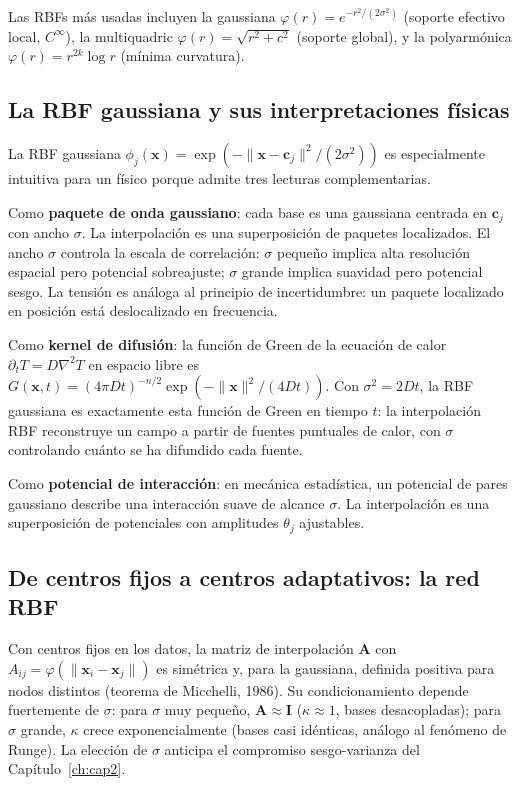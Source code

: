Las RBFs más usadas incluyen la gaussiana
$\varphi(r) = e^{-r^2/(2\sigma^2)}$ (soporte efectivo local, $C^\infty$),
la multiquadric $\varphi(r) = \sqrt{r^2+c^2}$ (soporte global), y la
polyarmónica $\varphi(r) = r^{2k}\log r$ (mínima curvatura).

\subsection{La RBF gaussiana y sus interpretaciones físicas}
\label{subsec:rbf_gaussiana}

La RBF gaussiana $\phi_j(\bm{x}) = \exp(-\|\bm{x}-\bm{c}_j\|^2
/(2\sigma^2))$ es especialmente intuitiva para un físico porque admite
tres lecturas complementarias.

Como \textbf{paquete de onda gaussiano}: cada base es una gaussiana
centrada en $\bm{c}_j$ con ancho $\sigma$. La interpolación es una
superposición de paquetes localizados. El ancho $\sigma$ controla la
escala de correlación: $\sigma$ pequeño implica alta resolución espacial
pero potencial sobreajuste; $\sigma$ grande implica suavidad pero
potencial sesgo. La tensión es análoga al principio de incertidumbre: un
paquete localizado en posición está deslocalizado en frecuencia.

Como \textbf{kernel de difusión}: la función de Green de la ecuación de
calor $\partial_t T = D\nabla^2 T$ en espacio libre es
$G(\bm{x},t) = (4\pi Dt)^{-n/2}\exp(-\|\bm{x}\|^2/(4Dt))$.
Con $\sigma^2 = 2Dt$, la RBF gaussiana es exactamente esta función de
Green en tiempo $t$: la interpolación RBF reconstruye un campo a partir
de fuentes puntuales de calor, con $\sigma$ controlando cuánto se ha
difundido cada fuente.

Como \textbf{potencial de interacción}: en mecánica estadística, un
potencial de pares gaussiano describe una interacción suave de alcance
$\sigma$. La interpolación es una superposición de potenciales con
amplitudes $\theta_j$ ajustables.

\subsection{De centros fijos a centros adaptativos: la red RBF}
\label{subsec:rbf_red}

Con centros fijos en los datos, la matriz de interpolación $\bm{A}$ con
$A_{ij} = \varphi(\|\bm{x}_i-\bm{x}_j\|)$ es simétrica y, para la
gaussiana, definida positiva para nodos distintos (teorema de Micchelli,
1986). Su condicionamiento depende fuertemente de $\sigma$: para $\sigma$
muy pequeño, $\bm{A} \approx \bm{I}$ ($\kappa \approx 1$, bases
desacopladas); para $\sigma$ grande, $\kappa$ crece exponencialmente
(bases casi idénticas, análogo al fenómeno de Runge). La elección de
$\sigma$ anticipa el compromiso sesgo-varianza del Capítulo~\ref{ch:cap2}.

